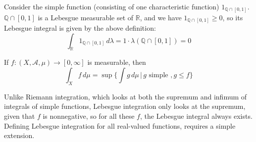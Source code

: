     \begin{example}
      Consider the simple function (consisting of one characteristic function) $1_{\mathbb{Q} \cap [0, 1]}$. $\mathbb{Q} \cap [0, 1]$ is a Lebesgue measurable set of $\mathbb{R}$, and we have $1_{\mathbb{Q} \cap [0, 1]} \geq 0$, so its Lebesgue integral is given by the above definition: 
      \begin{equation}
        \int_{\mathbb{R}} 1_{\mathbb{Q} \cap [0, 1]} \, d\lambda = 1 \cdot \lambda(\mathbb{Q} \cap [0, 1]) = 0
      \end{equation}
    \end{example}

    \begin{definition}
      If $f: (X, \mathcal{A}, \mu) \longrightarrow [0, \infty]$ is measurable, then 
      \begin{equation}
        \int_X f \, d\mu = \sup \Big\{ \int g\, d\mu \,\Big|\, g \text{ simple }, g \leq f\Big\}
      \end{equation}
    \end{definition}

    Unlike Riemann integration, which looks at both the supremum and infimum of integrals of simple functions, Lebesgue integration only looks at the supremum, given that $f$ is nonnegative, so for all these $f$, the Lebesgue integral always exists. Defining Lebesgue integration for all real-valued functions, requires a simple extension. 

